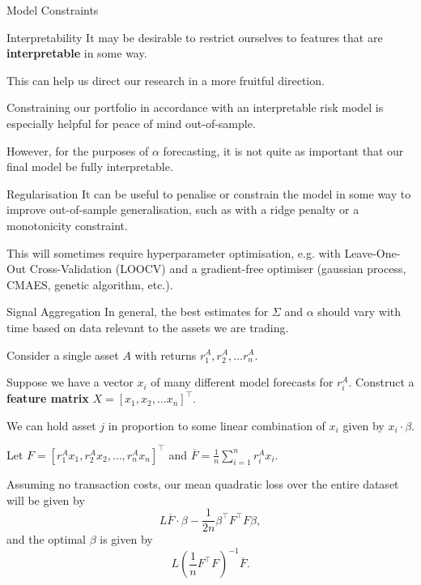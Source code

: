 \documentclass{beamer}
\begin{document}
\begin{frame}{Model Constraints}
	\begin{block}{Interpretability}
		It may be desirable to restrict ourselves to features that are \textbf{interpretable} in some way.

		This can help us direct our research in a more fruitful direction.

		Constraining our portfolio in accordance with an interpretable risk model is especially helpful for peace of mind out-of-sample.

		However, for the purposes of $\alpha$ forecasting, it is not quite as important that our final model be fully interpretable.
	\end{block}

	\begin{block}{Regularisation}
		It can be useful to penalise or constrain the model in some way to improve out-of-sample generalisation, such as with a ridge penalty or a monotonicity constraint.

		This will sometimes require hyperparameter optimisation, e.g. with Leave-One-Out Cross-Validation (LOOCV) and a gradient-free optimiser (gaussian process, CMAES, genetic algorithm, etc.).
	\end{block}
\end{frame}

\begin{frame}{Signal Aggregation}
	In general, the best estimates for $\Sigma$ and $\alpha$ should vary with time based on data relevant to the assets we are trading.

	Consider a single asset $A$ with returns $r_1^A,r_2^A,\ldots r_n^A$.

	Suppose we have a vector $x_i$ of many different model forecasts for $r_i^A$. Construct a \textbf{feature matrix} $X = [x_1,x_2,\ldots x_n]^\top$.

	We can hold asset $j$ in proportion to some linear combination of $x_i$ given by $x_i\cdot\beta$.

	Let $F=[r_1^A x_1, r_2^A x_2,\ldots, r_n^A x_n]^\top$ and $\overline{F} = \frac{1}{n} \sum_{i=1}^n r_i^A x_i$.

	Assuming no transaction costs, our mean quadratic loss over the entire dataset will be given by
	$$L \overline{F} \cdot \beta - \frac{1}{2n}\beta^\top F^\top F\beta,$$
	and the optimal $\beta$ is given by
	$$L\left(\frac{1}{n}F^\top F\right)^{-1}\overline{F}.$$
\end{frame}
\end{document}
